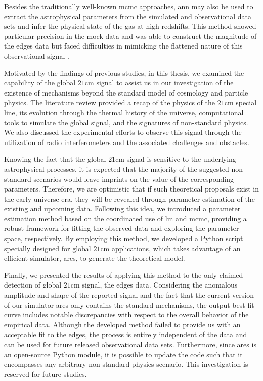 \documentclass[12pt, TexShade, letterpaper]{report}
\begin{document}
Besides the traditionally well-known \gls{mcmc} approaches, \gls{ann} may also be used to extract the astrophysical parameters from the simulated and observational data sets and infer the physical state of the gas at high redshifts. This method showed particular precision in the mock data and was able to construct the magnitude of the \gls{edges} data but faced difficulties in mimicking the flattened nature of this observational signal \cite{pe_nn_1}.\par

Motivated by the findings of previous studies, in this thesis, we examined the capability of the global $\mathrm{21cm}$ signal to assist us in our investigation of the existence of mechanisms beyond the standard model of cosmology and particle physics. The literature review provided a recap of the physics of the $\mathrm{21cm}$ special line, its evolution through the thermal history of the universe, computational tools to simulate the global signal, and the signatures of non-standard physics. We also discussed the experimental efforts to observe this signal through the utilization of radio interferometers and the associated challenges and obstacles.\par

Knowing the fact that the global $\mathrm{21cm}$ signal is sensitive to the underlying astrophysical processes, it is expected that the majority of the suggested non-standard scenarios would leave imprints on the value of the corresponding parameters. Therefore, we are optimistic that if such theoretical proposals exist in the early universe era, they will be revealed through parameter estimation of the existing and upcoming data. Following this idea, we introduced a parameter estimation method based on the coordinated use of \gls{lm} and \gls{mcmc}, providing a robust framework for fitting the observed data and exploring the parameter space, respectively. By employing this method, we developed a Python script specially designed for global $\mathrm{21cm}$ applications, which takes advantage of an efficient simulator, \gls{ares}, to generate the theoretical model.\par

Finally, we presented the results of applying this method to the only claimed detection of global $\mathrm{21cm}$ signal, the \gls{edges} data. Considering the anomalous amplitude and shape of the reported signal and the fact that the current version of our simulator \gls{ares} only contains the standard mechanisms, the output best-fit curve includes notable discrepancies with respect to the overall behavior of the empirical data. Although the developed method failed to provide us with an acceptable fit to the \gls{edges}, the process is entirely independent of the data and can be used for future released observational data sets. Furthermore, since \gls{ares} is an open-source Python module, it is possible to update the code such that it encompasses any arbitrary non-standard physics scenario. This investigation is reserved for future studies.\par
\end{document}
